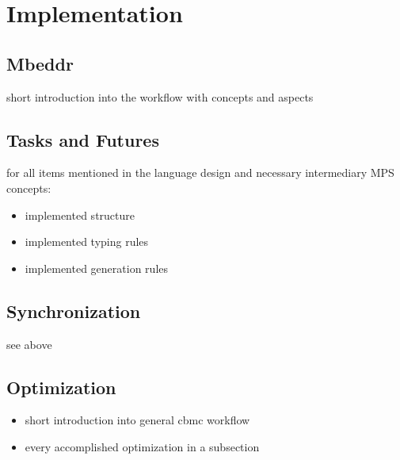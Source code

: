 \chapter{Implementation}
\section{Mbeddr}
short introduction into the workflow with concepts and aspects

\section{Tasks and Futures}
for all items mentioned in the language design and necessary intermediary MPS concepts:
\begin{itemize}
\item implemented structure
\item implemented typing rules
\item implemented generation rules
\end{itemize}
\section{Synchronization}
see above

\section{Optimization}
\begin{itemize}
\item short introduction into general cbmc workflow
\item every accomplished optimization in a subsection
\end{itemize}

